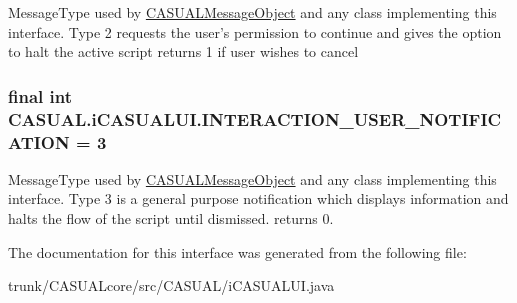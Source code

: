 Message\-Type used by \hyperlink{class_c_a_s_u_a_l_1_1_c_a_s_u_a_l_message_object}{C\-A\-S\-U\-A\-L\-Message\-Object} and any class implementing this interface. Type 2 requests the user's permission to continue and gives the option to halt the active script returns 1 if user wishes to cancel \hypertarget{interface_c_a_s_u_a_l_1_1i_c_a_s_u_a_l_u_i_a0ac4cd400b7dd01c7674fdb719956470}{
\subsubsection[{I\-N\-T\-E\-R\-A\-C\-T\-I\-O\-N\-\_\-\-U\-S\-E\-R\-\_\-\-N\-O\-T\-I\-F\-I\-C\-A\-T\-I\-O\-N}]{\setlength{\rightskip}{0pt plus 5cm}final int C\-A\-S\-U\-A\-L.\-i\-C\-A\-S\-U\-A\-L\-U\-I.\-I\-N\-T\-E\-R\-A\-C\-T\-I\-O\-N\-\_\-\-U\-S\-E\-R\-\_\-\-N\-O\-T\-I\-F\-I\-C\-A\-T\-I\-O\-N = 3}}\label{interface_c_a_s_u_a_l_1_1i_c_a_s_u_a_l_u_i_a0ac4cd400b7dd01c7674fdb719956470}
Message\-Type used by \hyperlink{class_c_a_s_u_a_l_1_1_c_a_s_u_a_l_message_object}{C\-A\-S\-U\-A\-L\-Message\-Object} and any class implementing this interface. Type 3 is a general purpose notification which displays information and halts the flow of the script until dismissed. returns 0. 

The documentation for this interface was generated from the following file\-:\begin{DoxyCompactItemize}
\item 
trunk/\-C\-A\-S\-U\-A\-Lcore/src/\-C\-A\-S\-U\-A\-L/i\-C\-A\-S\-U\-A\-L\-U\-I.\-java\end{DoxyCompactItemize}
